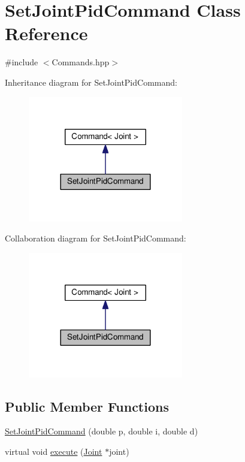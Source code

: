 \hypertarget{classSetJointPidCommand}{}\section{Set\+Joint\+Pid\+Command Class Reference}
\label{classSetJointPidCommand}


{\ttfamily \#include $<$Commands.\+hpp$>$}



Inheritance diagram for Set\+Joint\+Pid\+Command\+:\nopagebreak
\begin{figure}[H]
\begin{center}
\leavevmode
\includegraphics[width=192pt]{classSetJointPidCommand__inherit__graph}
\end{center}
\end{figure}


Collaboration diagram for Set\+Joint\+Pid\+Command\+:\nopagebreak
\begin{figure}[H]
\begin{center}
\leavevmode
\includegraphics[width=192pt]{classSetJointPidCommand__coll__graph}
\end{center}
\end{figure}
\subsection*{Public Member Functions}
\begin{DoxyCompactItemize}
\item 
\hyperlink{classSetJointPidCommand_a391c4a0751a31bc4e125a40b159e0443}{Set\+Joint\+Pid\+Command} (double p, double i, double d)
\item 
virtual void \hyperlink{classSetJointPidCommand_aa7a930ba0a725cc63117682703a58bad}{execute} (\hyperlink{classJoint}{Joint} $\ast$joint)
\end{DoxyCompactItemize}


